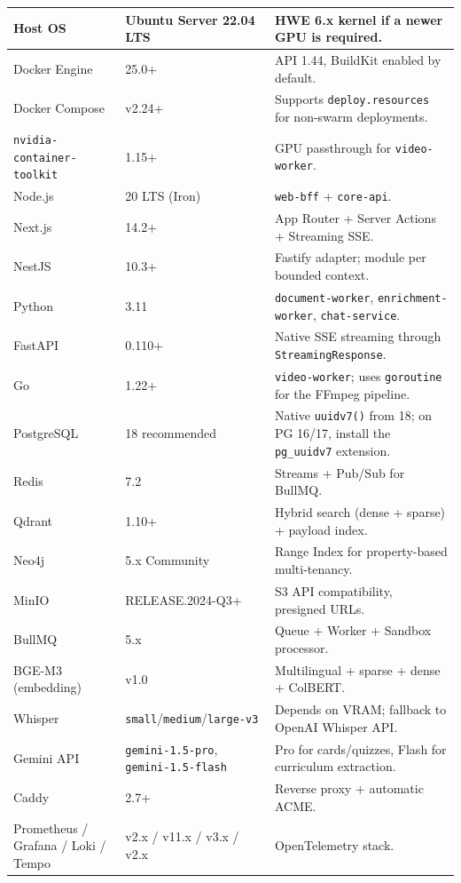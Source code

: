 \begin{longtable}{|p{4.3cm}|p{3.7cm}|p{5.5cm}|}
Host OS & Ubuntu Server 22.04 LTS & HWE 6.x kernel if a newer GPU is
    required. \\
\hline
Docker Engine & 25.0+ & API 1.44, BuildKit enabled by default. \\
\hline
Docker Compose & v2.24+ & Supports \texttt{deploy.resources} for
    non-swarm deployments. \\
\hline
\texttt{nvidia-container-}\allowbreak\texttt{toolkit} & 1.15+ & GPU passthrough for
    \texttt{video-worker}. \\
\hline
Node.js & 20 LTS (Iron) & \texttt{web-bff} + \texttt{core-api}. \\
\hline
Next.js & 14.2+ & App Router + Server Actions + Streaming SSE. \\
\hline
NestJS & 10.3+ & Fastify adapter; module per bounded context. \\
\hline
Python & 3.11 & \texttt{document-worker}, \texttt{enrichment-worker},
    \texttt{chat-service}. \\
\hline
FastAPI & 0.110+ & Native SSE streaming through
    \texttt{StreamingResponse}. \\
\hline
Go & 1.22+ & \texttt{video-worker}; uses \texttt{goroutine} for the
    FFmpeg pipeline. \\
\hline
PostgreSQL & 18 recommended & Native \texttt{uuidv7()} from 18;
    on PG 16/17, install the \texttt{pg\_uuidv7} extension. \\
\hline
Redis & 7.2 & Streams + Pub/Sub for BullMQ. \\
\hline
Qdrant & 1.10+ & Hybrid search (dense + sparse) + payload index. \\
\hline
Neo4j & 5.x Community & Range Index for property-based multi-tenancy. \\
\hline
MinIO & RELEASE.2024-Q3+ & S3 API compatibility, presigned URLs. \\
\hline
BullMQ & 5.x & Queue + Worker + Sandbox processor. \\
\hline
BGE-M3 (embedding) & v1.0 & Multilingual + sparse + dense + ColBERT. \\
\hline
Whisper & \texttt{small}/\allowbreak\texttt{medium}/\allowbreak\texttt{large-v3} & Depends
    on VRAM; fallback to OpenAI Whisper API. \\
\hline
Gemini API & \texttt{gemini-1.5-pro},
    \texttt{gemini-1.5-flash} & Pro for cards/quizzes, Flash for
    curriculum extraction. \\
\hline
Caddy & 2.7+ & Reverse proxy + automatic ACME. \\
\hline
Prometheus / Grafana / Loki / Tempo
    & v2.x / v11.x / v3.x / v2.x & OpenTelemetry stack. \\
\hline
\end{longtable}

